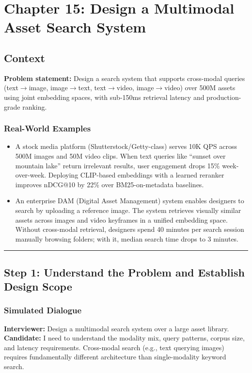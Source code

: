 \chapter{Chapter 15: Design a Multimodal Asset Search System}

\section*{Context}

\textbf{Problem statement:} Design a search system that supports cross-modal queries (text$\rightarrow$image, image$\rightarrow$text, text$\rightarrow$video, image$\rightarrow$video) over 500M assets using joint embedding spaces, with sub-150ms retrieval latency and production-grade ranking.

\subsection*{Real-World Examples}

\begin{itemize}
  \item A stock media platform (Shutterstock/Getty-class) serves 10K QPS across 500M images and 50M video clips. When text queries like ``sunset over mountain lake'' return irrelevant results, user engagement drops 15\% week-over-week. Deploying CLIP-based embeddings with a learned reranker improves nDCG@10 by 22\% over BM25-on-metadata baselines.
  \item An enterprise DAM (Digital Asset Management) system enables designers to search by uploading a reference image. The system retrieves visually similar assets across images and video keyframes in a unified embedding space. Without cross-modal retrieval, designers spend 40 minutes per search session manually browsing folders; with it, median search time drops to 3 minutes.
\end{itemize}

\bigskip\hrule\bigskip

\section*{Step 1: Understand the Problem and Establish Design Scope}

\subsection*{Simulated Dialogue}

\textbf{Interviewer:} Design a multimodal search system over a large asset library.\\
\textbf{Candidate:} I need to understand the modality mix, query patterns, corpus size, and latency requirements. Cross-modal search (e.g., text querying images) requires fundamentally different architecture than single-modality keyword search.

